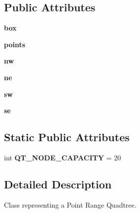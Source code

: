 \subsection*{Public Attributes}
\begin{DoxyCompactItemize}
\item 
\hypertarget{classprquadtree_1_1PRQuadTree_a2f1d8e21568aa0467a7dabedb50e3593}{}{\bfseries box}\label{classprquadtree_1_1PRQuadTree_a2f1d8e21568aa0467a7dabedb50e3593}

\item 
\hypertarget{classprquadtree_1_1PRQuadTree_a6534693edb5dd5450859c5b4b0773936}{}{\bfseries points}\label{classprquadtree_1_1PRQuadTree_a6534693edb5dd5450859c5b4b0773936}

\item 
\hypertarget{classprquadtree_1_1PRQuadTree_a6d0f1330cc70f704f8153fd1f386b9c3}{}{\bfseries nw}\label{classprquadtree_1_1PRQuadTree_a6d0f1330cc70f704f8153fd1f386b9c3}

\item 
\hypertarget{classprquadtree_1_1PRQuadTree_acf96c88788ee32d03032c490b9a90f68}{}{\bfseries ne}\label{classprquadtree_1_1PRQuadTree_acf96c88788ee32d03032c490b9a90f68}

\item 
\hypertarget{classprquadtree_1_1PRQuadTree_aee59816ff69872d39d406a103dd2e2f8}{}{\bfseries sw}\label{classprquadtree_1_1PRQuadTree_aee59816ff69872d39d406a103dd2e2f8}

\item 
\hypertarget{classprquadtree_1_1PRQuadTree_acf5a1f668e9962b03120856564e0a3b0}{}{\bfseries se}\label{classprquadtree_1_1PRQuadTree_acf5a1f668e9962b03120856564e0a3b0}

\end{DoxyCompactItemize}
\subsection*{Static Public Attributes}
\begin{DoxyCompactItemize}
\item 
\hypertarget{classprquadtree_1_1PRQuadTree_a8a1b023159e61d011e1c1c94f3534a87}{}int {\bfseries Q\+T\+\_\+\+N\+O\+D\+E\+\_\+\+C\+A\+P\+A\+C\+I\+T\+Y} = 20\label{classprquadtree_1_1PRQuadTree_a8a1b023159e61d011e1c1c94f3534a87}

\end{DoxyCompactItemize}


\subsection{Detailed Description}
\begin{DoxyVerb}Class representing a Point Range Quadtree.
\end{DoxyVerb}
 

